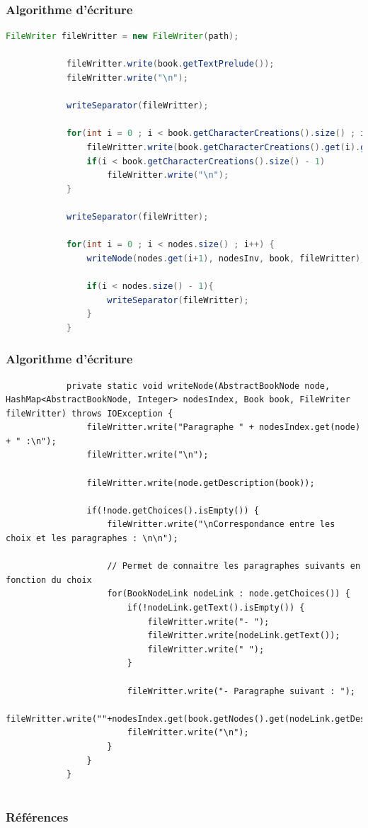 \documentclass[beamer]{BetterDocument}
\begin{document}
	\begin{frame}[fragile]
		\frametitle{Algorithme d'écriture}

		\begin{lstlisting}[gobble=12, language=java]
			FileWriter fileWritter = new FileWriter(path);

			fileWritter.write(book.getTextPrelude());
			fileWritter.write("\n");

			writeSeparator(fileWritter);

			for(int i = 0 ; i < book.getCharacterCreations().size() ; i++) {
				fileWritter.write(book.getCharacterCreations().get(i).getDescription(book));
				if(i < book.getCharacterCreations().size() - 1)
					fileWritter.write("\n");
			}

			writeSeparator(fileWritter);

			for(int i = 0 ; i < nodes.size() ; i++) {
				writeNode(nodes.get(i+1), nodesInv, book, fileWritter);

				if(i < nodes.size() - 1){
					writeSeparator(fileWritter);
				}
			}
		\end{lstlisting}
	\end{frame}

	\begin{frame}[fragile]
		\frametitle{Algorithme d'écriture}

		\begin{lstlisting}
			private static void writeNode(AbstractBookNode node, HashMap<AbstractBookNode, Integer> nodesIndex, Book book, FileWriter fileWritter) throws IOException {
				fileWritter.write("Paragraphe " + nodesIndex.get(node) + " :\n");
				fileWritter.write("\n");

				fileWritter.write(node.getDescription(book));

				if(!node.getChoices().isEmpty()) {
					fileWritter.write("\nCorrespondance entre les choix et les paragraphes : \n\n");

					// Permet de connaitre les paragraphes suivants en fonction du choix
					for(BookNodeLink nodeLink : node.getChoices()) {
						if(!nodeLink.getText().isEmpty()) {
							fileWritter.write("- ");
							fileWritter.write(nodeLink.getText());
							fileWritter.write(" ");
						}

						fileWritter.write("- Paragraphe suivant : ");
						fileWritter.write(""+nodesIndex.get(book.getNodes().get(nodeLink.getDestination())));
						fileWritter.write("\n");
					}
				}
			}
		\end{lstlisting}
	\end{frame}

	\section{}
	\subsection{}
	\begin{frame}[allowframebreaks]
	  \frametitle{Références}

	  \printbibliography
	 \end{frame}
\end{document}
